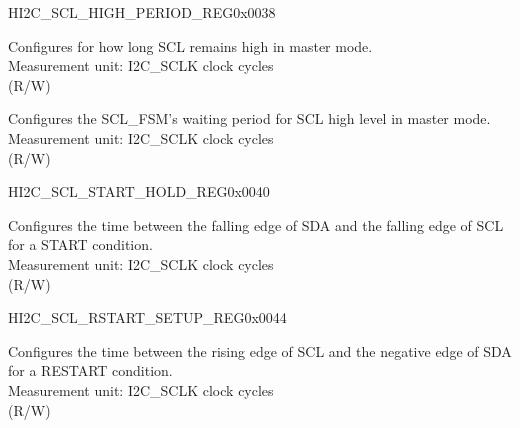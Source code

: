     \begin{register}{H}{I2C\_SCL\_HIGH\_PERIOD\_REG}{0x0038}\label{regdesc:I2CSCLHIGHPERIODREG}
    \regnewline%
    \begin{regdesc}\begin{reglist}
    \label{fielddesc:I2CSCLHIGHPERIOD}\item [I2C\_SCL\_HIGH\_PERIOD] Configures for how long SCL remains high in master mode.\\
    Measurement unit: I2C\_SCLK clock cycles \\ (R/W)
    \label{fielddesc:I2CSCLWAITHIGHPERIOD}\item [I2C\_SCL\_WAIT\_HIGH\_PERIOD] Configures the SCL\_FSM's waiting period for SCL high level in master mode.\\
    Measurement unit: I2C\_SCLK clock cycles \\ (R/W)
    \end{reglist}\end{regdesc}
    \end{register}


    \begin{register}{H}{I2C\_SCL\_START\_HOLD\_REG}{0x0040}\label{regdesc:I2CSCLSTARTHOLDREG}
    \regnewline%
    \begin{regdesc}\begin{reglist}
    \label{fielddesc:I2CSCLSTARTHOLDTIME}\item [I2C\_SCL\_START\_HOLD\_TIME] Configures the time between the falling edge of SDA and the falling edge of SCL for a START condition.\\
    Measurement unit: I2C\_SCLK clock cycles \\ (R/W)
    \end{reglist}\end{regdesc}
    \end{register}


    \begin{register}{H}{I2C\_SCL\_RSTART\_SETUP\_REG}{0x0044}\label{regdesc:I2CSCLRSTARTSETUPREG}
    \regnewline%
    \begin{regdesc}\begin{reglist}
    \label{fielddesc:I2CSCLRSTARTSETUPTIME}\item [I2C\_SCL\_RSTART\_SETUP\_TIME] Configures the time between the rising edge of SCL and the negative edge of SDA for a RESTART condition.\\
    Measurement unit: I2C\_SCLK clock cycles \\ (R/W)
    \end{reglist}\end{regdesc}
    \end{register}


